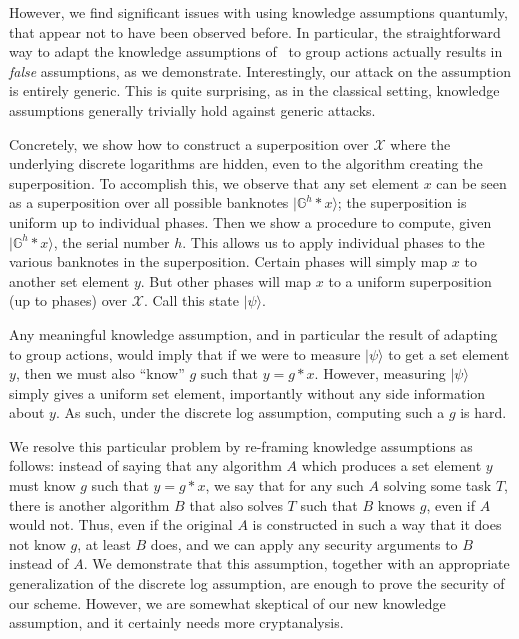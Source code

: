 \documentclass{article}\usepackage[a4paper,margin=20mm]{geometry}
\numberwithin{theorem}{section}
\numberwithin{equation}{section}
\newcommand{\G}{\mathbb{G}}
\newcommand{\Xs}{{\mathcal{X}}}
\begin{document}
However, we find significant issues with using knowledge assumptions quantumly, that appear not to have been observed before. In particular, the straightforward way to adapt the knowledge assumptions of~\cite{EC:LiuMonZha23} to group actions actually results in \emph{false} assumptions, as we demonstrate. Interestingly, our attack on the assumption is entirely generic. This is quite surprising, as in the classical setting, knowledge assumptions generally trivially hold against generic attacks.

Concretely, we show how to construct a superposition over $\Xs$ where the underlying discrete logarithms are hidden, even to the algorithm creating the superposition. To accomplish this, we observe that any set element $x$ can be seen as a superposition over all possible banknotes $|\G^h*x\rangle$; the superposition is uniform up to individual phases. Then we show a procedure to compute, given $|\G^h*x\rangle$, the serial number $h$. This allows us to apply individual phases to the various banknotes in the superposition. Certain phases will simply map $x$ to another set element $y$. But other phases will map $x$ to a uniform superposition (up to phases) over $\Xs$. Call this state $|\psi\rangle$.

Any meaningful knowledge assumption, and in particular the result of adapting~\cite{EC:LiuMonZha23} to group actions, would imply that if we were to measure $|\psi\rangle$ to get a set element $y$, then we must also ``know'' $g$ such that $y=g*x$. However, measuring $|\psi\rangle$ simply gives a uniform set element, importantly without any side information about $y$. As such, under the discrete log assumption, computing such a $g$ is hard.

We resolve this particular problem by re-framing knowledge assumptions as follows: instead of saying that any algorithm $A$ which produces a set element $y$ must know $g$ such that $y=g*x$, we say that for any such $A$ solving some task $T$, there is another algorithm $B$ that also solves $T$ such that $B$ knows $g$, even if $A$ would not. Thus, even if the original $A$ is constructed in such a way that it does not know $g$, at least $B$ does, and we can apply any security arguments to $B$ instead of $A$. We demonstrate that this assumption, together with an appropriate generalization of the discrete log assumption, are enough to prove the security of our scheme. However, we are somewhat skeptical of our new knowledge assumption, and it certainly needs more cryptanalysis.
\end{document}
